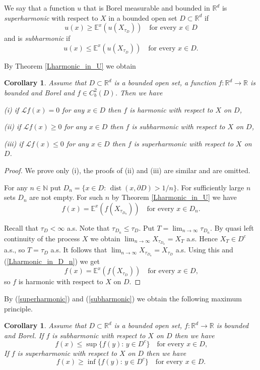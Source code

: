 \documentclass[a4paper,12pt,reqno]{amsart}
\newtheorem{corollary}[theorem]{Corollary}
\theoremstyle{definition}
\theoremstyle{remark}
\newcommand{\calL}{\mathcal{L}}
\newcommand{\Ee}{\mathds{E}} %
\newcommand{\R}{\mathds{R}}
\newcommand{\N}{{\mathds{N}}}
\DeclareMathOperator{\dist}{dist}
\begin{document}
We say that a function $u$ that is Borel measurable and bounded in $\R^d$ is {\it superharmonic} with respect to $X$ in a bounded open set $D \subset \R^d$ if 
\begin{equation}
\label{superharmonic}
u(x) \ge \Ee^x(u(X_{\tau_D})) \quad \text{for every $x \in D$}
\end{equation} 
and is {\it subharmonic} if
\begin{equation}
\label{subharmonic}
u(x) \le \Ee^x(u(X_{\tau_D})) \quad \text{for every $x \in D$}.
\end{equation}

By Theorem \ref{Lharmonic_in_U} we obtain
\begin{corollary}
\label{Lharmonic_in_D}
Assume that $D \subset \R^d$ is a bounded open set, a function $f:\R^d \to \R$ is bounded and Borel and $f \in C_b^2(D)$. Then we have

(i) if $\calL f(x) = 0$ for any $x \in D$ then $f$ is harmonic with respect to $X$ on $D$, 

(ii) if $\calL f(x) \ge 0$ for any $x \in D$ then $f$ is subharmonic with respect to $X$ on $D$, 

(iii) if $\calL f(x) \le 0$ for any $x \in D$ then $f$ is superharmonic with respect to $X$ on $D$. 
\end{corollary}
\begin{proof}
We prove only (i), the proofs of (ii) and (iii) are similar and are omitted.

For any $n \in \N$ put $D_n = \{x \in D: \, \dist(x, \partial D) > 1/n\}$. For sufficiently large $n$ sets $D_n$ are not empty. For such $n$ by Theorem \ref{Lharmonic_in_U} we have
\begin{equation}
\label{Lharmonic_in_D_n}
f(x) = \Ee^x(f(X_{\tau_{D_n}})) \quad \text{for every $x \in D_n$.}
\end{equation}

Recall that $\tau_D < \infty$ a.s. Note that $\tau_{D_n} \le \tau_D$. Put $T = \lim_{n \to \infty} \tau_{D_n}$.  By quasi left continuity of the process $X$ we obtain $\lim_{n \to \infty} X_{\tau_{D_n}} = X_{T}$ a.s. Hence $X_{T} \in D^c$ a.s., so $T = \tau_D$ a.s. It follows that $\lim_{n \to \infty} X_{\tau_{D_n}} = X_{\tau_D}$ a.s. Using this and (\ref{Lharmonic_in_D_n}) we get
$$
f(x) = \Ee^x(f(X_{\tau_D})) \quad \text{for every $x \in D$,}
$$
so $f$ is harmonic with respect to $X$ on $D$.
\end{proof}

By (\ref{superharmonic}) and (\ref{subharmonic}) we obtain the following maximum principle.
\begin{corollary}
\label{maximum_principle}
Assume that $D \subset \R^d$ is a bounded open set, $f:\R^d \to \R$ is bounded and Borel. If $f$ is subharmonic with respect to $X$ on $D$ then we have
$$
f(x) \le \sup\{f(y): \, y \in D^c\} \quad \text{for every $x \in D$,}
$$
If $f$ is superharmonic with respect to $X$ on $D$ then we have
$$
f(x) \ge \inf\{f(y): \, y \in D^c\} \quad \text{for every $x \in D$.}
$$
\end{corollary}
\end{document}
